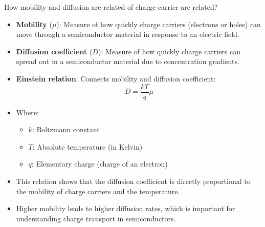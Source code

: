 \begin{frame}{How mobility and diffusion are related of charge carrier are related?}
    \begin{itemize}
        \item \textbf{Mobility} ($\mu$): Measure of how quickly charge carriers (electrons or holes) can move through a semiconductor material in response to an electric field.
        \item \textbf{Diffusion coefficient} ($D$): Measure of how quickly charge carriers can spread out in a semiconductor material due to concentration gradients.
        \item \textbf{Einstein relation}: Connects mobility and diffusion coefficient:
        \begin{equation}
        D = \frac{kT}{q} \mu    
        \end{equation}
        \item Where:
        \begin{itemize}
            \item $k$: Boltzmann constant
            \item $T$: Absolute temperature (in Kelvin)
            \item $q$: Elementary charge (charge of an electron)
        \end{itemize}
        \item This relation shows that the diffusion coefficient is directly proportional to the mobility of charge carriers and the temperature.
        \item Higher mobility leads to higher diffusion rates, which is important for understanding charge transport in semiconductors.
    \end{itemize}
    \end{frame}

